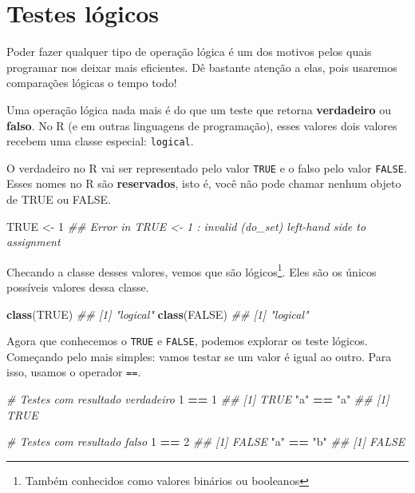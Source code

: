 \documentclass[]{book}
\newenvironment{Shaded}{\begin{snugshade}}{\end{snugshade}}
\newcommand{\CommentTok}[1]{\textcolor[rgb]{0.56,0.35,0.01}{\textit{#1}}}
\newcommand{\DecValTok}[1]{\textcolor[rgb]{0.00,0.00,0.81}{#1}}
\newcommand{\KeywordTok}[1]{\textcolor[rgb]{0.13,0.29,0.53}{\textbf{#1}}}
\newcommand{\NormalTok}[1]{#1}
\newcommand{\OperatorTok}[1]{\textcolor[rgb]{0.81,0.36,0.00}{\textbf{#1}}}
\newcommand{\OtherTok}[1]{\textcolor[rgb]{0.56,0.35,0.01}{#1}}
\newcommand{\StringTok}[1]{\textcolor[rgb]{0.31,0.60,0.02}{#1}}
\begin{document}
\hypertarget{testes-luxf3gicos}{%
\section{Testes lógicos}\label{testes-luxf3gicos}}

Poder fazer qualquer tipo de operação lógica é um dos motivos pelos quais programar nos deixar mais eficientes. Dê bastante atenção a elas, pois usaremos comparações lógicas o tempo todo!

Uma operação lógica nada mais é do que um teste que retorna \textbf{verdadeiro} ou \textbf{falso}. No R (e em outras linguagens de programação), esses valores dois valores recebem uma classe especial: \texttt{logical}.

O verdadeiro no R vai ser representado pelo valor \texttt{TRUE} e o falso pelo valor \texttt{FALSE}. Esses nomes no R são \textbf{reservados}, isto é, você não pode chamar nenhum objeto de TRUE ou FALSE.

\begin{Shaded}
\begin{Highlighting}[]
\OtherTok{TRUE}\NormalTok{ <-}\StringTok{ }\DecValTok{1}
\CommentTok{## Error in TRUE <- 1 : invalid (do_set) left-hand side to assignment}
\end{Highlighting}
\end{Shaded}

Checando a classe desses valores, vemos que são lógicos\footnote{Também conhecidos como valores binários ou booleanos}. Eles são os únicos possíveis valores dessa classe.

\begin{Shaded}
\begin{Highlighting}[]
\KeywordTok{class}\NormalTok{(}\OtherTok{TRUE}\NormalTok{)}
\CommentTok{## [1] "logical"}
\KeywordTok{class}\NormalTok{(}\OtherTok{FALSE}\NormalTok{)}
\CommentTok{## [1] "logical"}
\end{Highlighting}
\end{Shaded}

Agora que conhecemos o \texttt{TRUE} e \texttt{FALSE}, podemos explorar os teste lógicos. Começando pelo mais simples: vamos testar se um valor é igual ao outro. Para isso, usamos o operador \texttt{==}.

\begin{Shaded}
\begin{Highlighting}[]
\CommentTok{# Testes com resultado verdadeiro}
\DecValTok{1} \OperatorTok{==}\StringTok{ }\DecValTok{1}
\CommentTok{## [1] TRUE}
\StringTok{"a"} \OperatorTok{==}\StringTok{ "a"}
\CommentTok{## [1] TRUE}

\CommentTok{# Testes com resultado falso}
\DecValTok{1} \OperatorTok{==}\StringTok{ }\DecValTok{2}
\CommentTok{## [1] FALSE}
\StringTok{"a"} \OperatorTok{==}\StringTok{ "b"}
\CommentTok{## [1] FALSE}
\end{Highlighting}
\end{Shaded}
\end{document}
